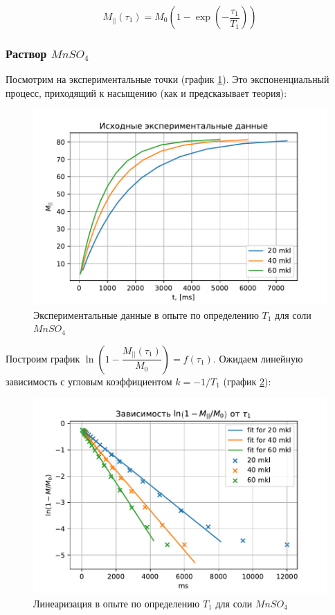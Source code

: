 \begin{equation}
\label{eq:M_parall-from-T1}
M_{||} (\tau_1) = M_0 \left(1 - \exp \left( -\dfrac{\tau_1}{T_1} \right) \right)
\end{equation}

\subsubsection{Раствор $ Mn SO_4 $}
Посмотрим на экспериментальные точки (график \ref{fig:mnt1exp}). Это экспоненциальный процесс, приходящий к насыщению (как и предсказывает теория):

\begin{figure}[!h]
	\hspace{-1em}
	\includegraphics[width=1.0\linewidth]{data/Mn_T_1_exp}
	\caption{Экспериментальные данные в опыте по определению $ T_1 $ для соли $ Mn SO_4 $}
	\label{fig:mnt1exp}
\end{figure}

Построим график $ \ln \left( 1 - \dfrac{M_{||} (\tau_1)}{M_0} \right) = f(\tau_1)$. Ожидаем линейную зависимость с угловым коэффициентом $ k = -1/T_1 $ (график \ref{fig:mnt1reg}):

\begin{figure}[h]
	\hspace{-1em}
	\includegraphics[width=1.0\linewidth]{data/Mn_T_1_reg}
	\caption{Линеаризация в опыте по определению $ T_1 $ для соли $ Mn SO_4 $}
	\label{fig:mnt1reg}
\end{figure}

